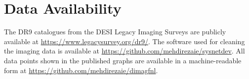\section*{Data Availability}
\label{sec:dataavail}
The DR9 catalogues from the DESI Legacy Imaging Surveys are publicly available at \href{https://www.legacysurvey.org/dr9/}{https://www.legacysurvey.org/dr9/}. The software used for cleaning the imaging data is available at \href{https://github.com/mehdirezaie/sysnetdev}{https://github.com/mehdirezaie/sysnetdev}. All data points shown in the published graphs are available in a machine-readable form at \href{https://github.com/mehdirezaie/dimagfnl}{https://github.com/mehdirezaie/dimagfnl}.